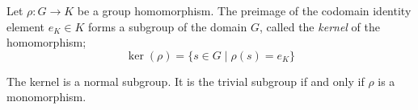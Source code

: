 \documentclass{article}
\begin{document}
Let $\rho :G\to K$ be a group homomorphism. The preimage of the
codomain identity element $e_K\in K$ forms a subgroup of the domain
$G$, called the \emph{kernel} of the homomorphism;
$$\operatorname{ker}(\rho)= \{ s \in G\mid\rho   (s)=e_K\} $$

The kernel is a normal subgroup.  It is the trivial subgroup if and
only if $\rho$ is a monomorphism.
\end{document}
